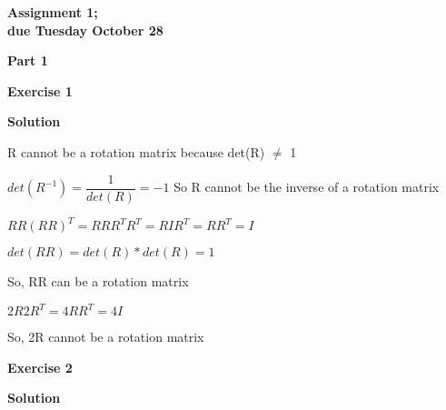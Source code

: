 \documentclass[12pt]{article}
\begin{document}


\begin{center}
\textbf{Assignment 1;\\
due Tuesday October 28}
\end{center}

\textbf{Part 1}	

\bigskip
	
\textbf{Exercise 1}		
		
\textbf{Solution}

\medskip

\begin{list}{()~}{}
\item 
R cannot be a rotation matrix because det(R) $\neq$ 1  
\item
$det(R^{-1}) = \dfrac{1}{det(R)} = -1$
So R cannot be the inverse of a rotation matrix
\item
$RR(RR)^T = RR R^T R^T = R I R^T = RR^T = I$

$det(RR) = det(R) * det(R) = 1$

So, RR can be a rotation matrix
\item
$2R  2R^T = 4 RR^T = 4I$

So, 2R cannot be a rotation matrix
\end{list}

\textbf{Exercise 2}		
		
\textbf{Solution}

\medskip
\end{document}
